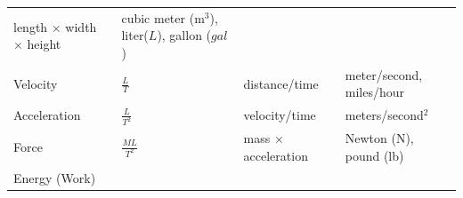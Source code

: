 \documentclass[
]{book}
\begin{document}
\begin{longtable}[]{@{}llll@{}}
\begin{minipage}[t]{0.23\columnwidth}
length \(\times\) width \(\times\) height\strut
\end{minipage} & \begin{minipage}[t]{0.28\columnwidth}\raggedright
cubic meter (m\(^3\)), liter(\(L\)), gallon (\(gal\))\strut
\end{minipage}\tabularnewline
\begin{minipage}[t]{0.21\columnwidth}\raggedright
Velocity\strut
\end{minipage} & \begin{minipage}[t]{0.17\columnwidth}\raggedright
\(\frac{L}{T}\)\strut
\end{minipage} & \begin{minipage}[t]{0.23\columnwidth}\raggedright
distance/time\strut
\end{minipage} & \begin{minipage}[t]{0.28\columnwidth}\raggedright
meter/second, miles/hour\strut
\end{minipage}\tabularnewline
\begin{minipage}[t]{0.21\columnwidth}\raggedright
Acceleration\strut
\end{minipage} & \begin{minipage}[t]{0.17\columnwidth}\raggedright
\(\frac{L}{T^2}\)\strut
\end{minipage} & \begin{minipage}[t]{0.23\columnwidth}\raggedright
velocity/time\strut
\end{minipage} & \begin{minipage}[t]{0.28\columnwidth}\raggedright
meters/second\(^2\)\strut
\end{minipage}\tabularnewline
\begin{minipage}[t]{0.21\columnwidth}\raggedright
Force\strut
\end{minipage} & \begin{minipage}[t]{0.17\columnwidth}\raggedright
\(\frac{ML}{T^2}\)\strut
\end{minipage} & \begin{minipage}[t]{0.23\columnwidth}\raggedright
mass \(\times\) acceleration\strut
\end{minipage} & \begin{minipage}[t]{0.28\columnwidth}\raggedright
Newton (N), pound (lb)\strut
\end{minipage}\tabularnewline
\begin{minipage}[t]{0.21\columnwidth}\raggedright
Energy (Work)\strut
\end{minipage} & \begin{minipage}[t]{0.17\columnwidth}\raggedright

\end{minipage}
\end{longtable}
\end{document}
